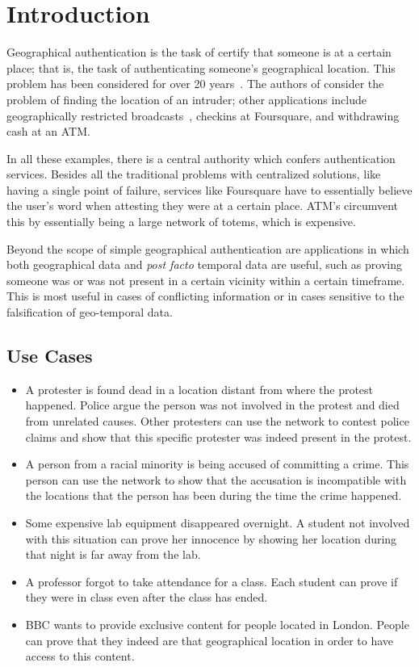 \section{Introduction}

Geographical authentication
is the task of certify that someone is at a certain place;
that is,
the task of authenticating someone's geographical location.
This problem has been considered for over 20 years~\cite{denning_1996}.
The authors of \cite{denning_1996} consider the problem of finding
the location of an intruder;
other applications include geographically restricted broadcasts~\cite{gdpr},
checkins at Foursquare,
and withdrawing cash at an ATM.

In all these examples,
there is a central authority which confers authentication services.
Besides all the traditional problems with centralized solutions,
like having a single point of failure,
services like Foursquare have to essentially believe the user's word
when attesting they were at a certain place.
ATM's circumvent this by essentially being a large network of totems,
which is expensive.

Beyond the scope of simple geographical authentication
are applications in which both geographical data and \textit{post facto}
temporal data are useful, such as
proving someone was or was not present in a certain vicinity within a
certain timeframe.
This is most useful in cases of conflicting information or in cases sensitive to
the falsification of geo-temporal data.

\subsection{Use Cases}

\begin{itemize}
	\item A protester is found dead in a location distant from where the protest happened.
		Police argue the person was not involved in the protest
		and died from unrelated causes.
		Other protesters can use the network to contest police claims
		and show that this specific protester was indeed present in the protest.

	\item A person from a racial minority is being accused of committing a crime.
		This person can use the network to show that the accusation
		is incompatible with the locations that the person has been
		during the time the crime happened.

	\item Some expensive lab equipment disappeared overnight.
		A student not involved with this situation
		can prove her innocence by showing her location during that night
		is far away from the lab.

	\item A professor forgot to take attendance for a class.
		Each student can prove if they were in class
		even after the class has ended.

	\item BBC wants to provide exclusive content for people located in London.
		People can prove that they indeed are that geographical location
		in order to have access to this content.
\end{itemize}


